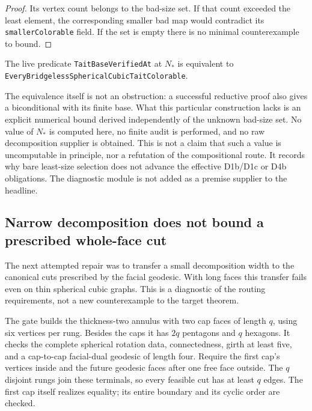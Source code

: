 \begin{proof}
Its vertex count belongs to the bad-size set.  If that count exceeded the
least element, the corresponding smaller bad map would contradict its
\texttt{smallerColorable} field.  If the set is empty there is no minimal
counterexample to bound.
\end{proof}

\begin{proposition}
The live predicate \texttt{TaitBaseVerifiedAt} at $N_*$ is equivalent to
\texttt{EveryBridgelessSphericalCubicTaitColorable}.
\end{proposition}

The equivalence itself is not an obstruction: a successful reductive proof
also gives a biconditional with its finite base.  What this particular
construction lacks is an explicit numerical bound derived independently of
the unknown bad-size set.  No value of $N_*$ is computed here, no finite audit
is performed, and no raw decomposition supplier is obtained.  This is not a
claim that such a value is uncomputable in principle, nor a refutation of the
compositional route.  It records why bare least-size selection does not
advance the effective D1b/D1c or D4b obligations.  The diagnostic module is
not added as a premise supplier to the headline.

\subsection{Narrow decomposition does not bound a prescribed whole-face cut}
\label{sec:thin-annulus-forced-cut-audit}

The next attempted repair was to transfer a small decomposition width to the
canonical cuts prescribed by the facial geodesic.  With long faces this
transfer fails even on thin spherical cubic graphs.  This is a diagnostic
of the routing requirements, not a new counterexample to the target theorem.

The gate builds the thickness-two annulus with two cap faces of length $q$,
using six vertices per rung.  Besides the caps it has $2q$ pentagons and
$q$ hexagons.  It checks the complete spherical rotation data, connectedness,
girth at least five, and a cap-to-cap facial-dual geodesic of length four.
Require the first cap's vertices inside and the future geodesic faces after
one free face outside.  The $q$ disjoint rungs join these terminals, so every
feasible cut has at least $q$ edges.  The first cap itself realizes equality;
its entire boundary and its cyclic order are checked.

